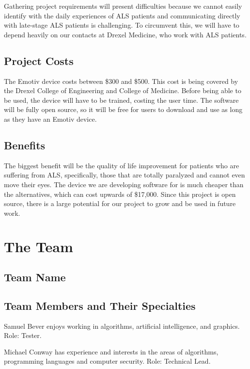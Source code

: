 \documentclass{report}
\begin{document}
Gathering project requirements will present difficulties because we cannot
easily identify with the daily experiences of ALS patients and communicating
directly with late-stage ALS patients is challenging. To circumvent this, we
will have to depend heavily on our contacts at Drexel Medicine, who work
with ALS patients.

\subsection*{Project Costs}
The Emotiv device costs between \$300 and \$500. This cost is being covered
by the Drexel College of Engineering and College of Medicine. Before being
able to be used, the device will have to be trained, costing the user time.
The software will be fully open source, so it will be free for users to
download and use as long as they have an Emotiv device.

\subsection*{Benefits}
The biggest benefit will be the quality of life improvement for patients who
are suffering from ALS, specifically, those that are totally paralyzed and
cannot even move their eyes. The device we are developing software for is
much cheaper than the alternatives, which can cost upwards of \$17,000.
Since this project is open source, there is a large potential for our
project to grow and be used in future work.

\newpage
\section*{\centering The Team}

\subsection*{Team Name}


\subsection*{Team Members and Their Specialties}

Samuel Bever enjoys working in algorithms, artificial intelligence, and
graphics. Role: Tester.

Michael Conway has experience and interests in the areas of algorithms,
programming languages and computer security. Role: Technical Lead.
\end{document}
